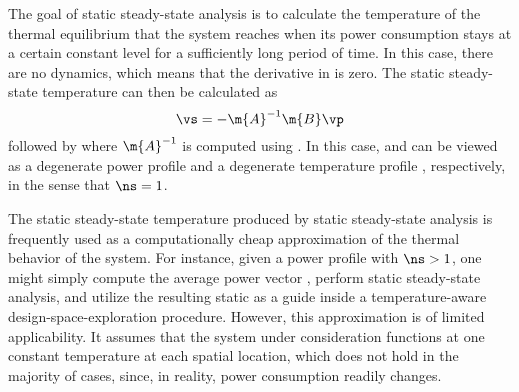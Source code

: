The goal of static steady-state analysis is to calculate the temperature of the
thermal equilibrium that the system reaches when its power consumption stays at
a certain constant level \vp for a sufficiently long period of time. In this
case, there are no dynamics, which means that the derivative in
 is zero. The static steady-state temperature \vq
can then be calculated as
\[
  \vs = -\m{A}^{-1} \m{B} \vp
\]
followed by  where $\m{A}^{-1}$ is computed using
. In this case, \vp and \vq can be viewed as a degenerate
power profile \mp and a degenerate temperature profile \mq, respectively, in the
sense that $\ns = 1$.

The static steady-state temperature produced by static steady-state analysis is
frequently used as a computationally cheap approximation of the thermal behavior
of the system. For instance, given a power profile \mp with $\ns > 1$, one might
simply compute the average power vector \vp, perform static steady-state
analysis, and utilize the resulting static \vq as a guide inside a
temperature-aware design-space-exploration procedure. However, this
approximation is of limited applicability. It assumes that the system under
consideration functions at one constant temperature at each spatial location,
which does not hold in the majority of cases, since, in reality, power
consumption readily changes.
